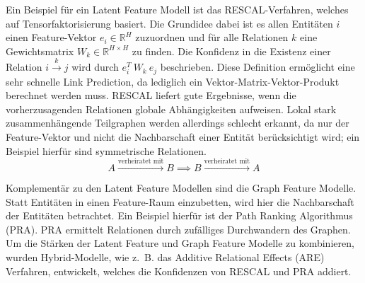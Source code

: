 \documentclass[11pt, a4paper]{scrreprt}
\begin{document}
Ein Beispiel für ein Latent Feature Modell ist das RESCAL-Verfahren, welches auf Tensorfaktorisierung basiert.
Die Grundidee dabei ist es allen Entitäten $i$ einen Feature-Vektor $e_i \in \mathbb{R}^H$ zuzuordnen und für alle Relationen $k$ eine Gewichtsmatrix $W_k \in \mathbb{R}^{H \times H}$ zu finden.
Die Konfidenz in die Existenz einer Relation $i \xrightarrow{k} j$ wird durch $e_i^T\ W_k\ e_j$ beschrieben.
Diese Definition ermöglicht eine sehr schnelle Link Prediction, da lediglich ein Vektor-Matrix-Vektor-Produkt berechnet werden muss.
RESCAL liefert gute Ergebnisse, wenn die vorherzusagenden Relationen globale Abhängigkeiten aufweisen.
Lokal stark zusammenhängende Teilgraphen werden allerdings schlecht erkannt, da nur der Feature-Vektor und nicht die Nachbarschaft einer Entität berücksichtigt wird;
ein Beispiel hierfür sind symmetrische Relationen.
$$A \xrightarrow{\text{verheiratet mit}} B \implies B \xrightarrow{\text{verheiratet mit}} A$$

Komplementär zu den Latent Feature Modellen sind die Graph Feature Modelle.
Statt Entitäten in einen Feature-Raum einzubetten, wird hier die Nachbarschaft der Entitäten betrachtet.
Ein Beispiel hierfür ist der Path Ranking Algorithmus (PRA). PRA ermittelt Relationen durch zufälliges Durchwandern des Graphen.
Um die Stärken der Latent Feature und Graph Feature Modelle zu kombinieren, wurden Hybrid-Modelle, wie z.~B. das Additive Relational Effects (ARE) Verfahren, entwickelt, welches die Konfidenzen von RESCAL und PRA addiert.\\
\end{document}
